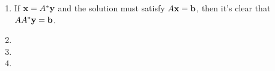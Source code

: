 \documentclass{article}
\begin{document}
\begin{enumerate}[label=(\roman*)]
    \end{enumerate}
    
    \begin{enumerate}[label=(\roman*)]
        \item If $\mathbf{x}=A^* \mathbf{y}$ and the solution must satisfy $A\mathbf{x}= \mathbf{b}$, then it's clear that $AA^* \mathbf{y} = \mathbf{b}$.
        \item
        \item 
        \item
    \end{enumerate}
\end{document}
